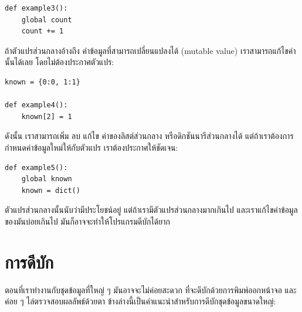 \begin{verbatim}
def example3():
    global count
    count += 1
\end{verbatim}
%
ถ้าตัวแปรส่วนกลางอ้างถึง ค่าข้อมูลที่สามารถเปลี่ยนแปลงได้ (mutable value)
เราสามารถแก้ไขค่านั้นได้เลย โดยไม่ต้องประกาศตัวแปร:

\begin{verbatim}
known = {0:0, 1:1}

def example4():
    known[2] = 1
\end{verbatim}
%
ดังนั้น เราสามารถเพิ่ม ลบ แก้ไข ค่าของลิสต์ส่วนกลาง หรือดิกชันนารีส่วนกลางได้
แต่ถ้าเราต้องการกำหนดค่าข้อมูลใหม่ให้กับตัวแปร เราต้องประกาศให้ชัดเจน:

\begin{verbatim}
def example5():
    global known
    known = dict()
\end{verbatim}
%
ตัวแปรส่วนกลางนั้นนับว่ามีประโยชน์อยู่
แต่ถ้าเรามีตัวแปรส่วนกลางมากเกินไป
และเราแก้ไขค่าข้อมูลของมันบ่อยเกินไป
มันก็อาจจะทำให้โปรแกรมดีบักได้ยาก


\section{การดีบัก}

ตอนที่เราทำงานกับชุดข้อมูลที่ใหญ่ ๆ 
มันอาจจะไม่ค่อยสะดวก
ที่จะดีบักด้วยการพิมพ์ออกหน้าจอ และค่อย ๆ ไล่ตรวจสอบผลลัพธ์ด้วยตา
ข้างล่างนี้เป็นคำแนะนำสำหรับการดีบักชุดข้อมูลขนาดใหญ่:

